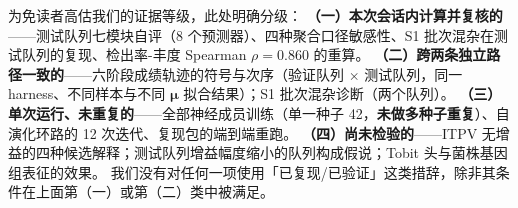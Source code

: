 \begin{keybox}[title=证据强度的自我标注]
\small
为免读者高估我们的证据等级，此处明确分级：
\textbf{（一）本次会话内计算并复核的}——测试队列七模块自评（8 个预测器）、四种聚合口径敏感性、S1 批次混杂在测试队列的复现、检出率-丰度 Spearman $\rho=0.860$ 的重算。
\textbf{（二）跨两条独立路径一致的}——六阶段成绩轨迹的符号与次序（验证队列 $\times$ 测试队列，同一 harness、不同样本与不同 $\bm{\mu}$ 拟合结果）；S1 批次混杂诊断（两个队列）。
\textbf{（三）单次运行、未重复的}——全部神经成员训练（单一种子 42，\textbf{未做多种子重复}）、自演化环路的 12 次迭代、复现包的端到端重跑。
\textbf{（四）尚未检验的}——ITPV 无增益的四种候选解释；测试队列增益幅度缩小的队列构成假说；Tobit 头与菌株基因组表征的效果。
我们没有对任何一项使用「已复现/已验证」这类措辞，除非其条件在上面第（一）或第（二）类中被满足。
\end{keybox}
